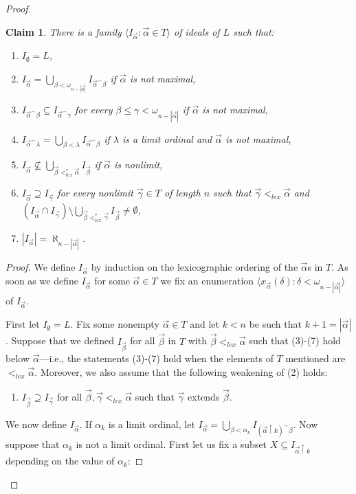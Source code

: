 \documentclass[]{amsart}
\newtheorem{claim}{Claim}[theorem]
\theoremstyle{definition}
\theoremstyle{remark}
\begin{document}
\begin{proof}
\begin{claim}\label{prop:wehrung:claim:1}
There is a family $\langle I_{\vec{\alpha}} : \vec{\alpha} \in T\rangle$ of ideals  of $L$ such that:
\begin{enumerate}[label={\upshape (\arabic*)}]
\item $I_{\emptyset} = L$,
\item $I_{\vec{\alpha}} = \bigcup_{\beta < \omega_{n-|\vec{\alpha}|}} I_{\vec{\alpha}^\smallfrown \beta}$ if $\vec{\alpha}$ is not maximal,
\item $I_{\vec{\alpha}^\smallfrown \beta} \subseteq I_{\vec{\alpha}^\smallfrown \gamma}$ for every $\beta \le \gamma < \omega_{n-|\vec{\alpha}|}$ if $\vec{\alpha}$ is not maximal,
\item $I_{\vec{\alpha}^\smallfrown \lambda} = \bigcup_{\beta < \lambda} I_{\vec{\alpha}^\smallfrown \beta}$ if $\lambda$ is a limit ordinal and $\vec{\alpha}$ is not maximal,
\item $I_{\vec{\alpha}} \nsubseteq \bigcup_{\vec{\beta} <_{lex}^* \vec{\alpha}} I_{\vec{\beta}}$ if $\vec{\alpha}$ is nonlimit,
\item $I_{\vec{\alpha}} \supseteq I_{\vec{\gamma}}$ for every nonlimit $\vec{\gamma} \in T$ of length $n$ such that $\vec{\gamma} <_{lex} \vec{\alpha}$ and $(I_{\vec{\alpha}} \cap I_{\vec{\gamma}}) \setminus \bigcup_{\vec{\beta} <_{lex}^* \vec{\gamma}} I_{\vec{\beta}} \neq \emptyset$,
\item $|I_{\vec{\alpha}}| = \aleph_{n-|\vec{\alpha}|}$.
\end{enumerate}
\end{claim}
\begin{proof}
We define $I_{\vec{\alpha}}$ by induction on the lexicographic ordering of the $\vec{\alpha}$s in $T$. As soon as we define $I_{\vec{\alpha}}$ for some $\vec{\alpha} \in T$ we fix an enumeration $\langle x_{\vec{\alpha}}(\delta) : \delta < \omega_{n-|\vec{\alpha}|} \rangle$ of $I_{\vec{\alpha}}$. 

First let $I_{\emptyset} = L$. Fix some nonempty $\vec{\alpha} \in T$ and let $k < n$ be such that $k+1 = |\vec{\alpha}|$. Suppose that we defined $I_{\vec{\beta}}$ for all $\vec{\beta}$ in $T$ with $\vec{\beta} <_{lex} \vec{\alpha}$ such that (3)-(7) hold below $\vec{\alpha}$---i.e., the statements (3)-(7) hold when the elements of $T$ mentioned are $<_{lex} \vec{\alpha}$. Moreover, we also assume that the following weakening of (2) holds:
\begin{enumerate}
\item[(2')] $I_{\vec{\beta}} \supseteq I_{\vec{\gamma}}$ for all $\vec{\beta},\vec{\gamma} <_{lex} \vec{\alpha}$ such that $\vec{\gamma}$ extends $\vec{\beta}$.
\end{enumerate} 
We now define $I_{\vec{\alpha}}$. If $\alpha_k$ is a limit ordinal, let $I_{\vec{\alpha}} = \bigcup_{\beta < \alpha_k} I_{(\vec{\alpha} \upharpoonright k)^\smallfrown \beta}$. Now suppose that $\alpha_k$ is not a limit ordinal. First let us fix a subset $X \subseteq I_{\vec{\alpha} \upharpoonright k}$ depending on the value of $\alpha_k$:\vspace{0.5em}


\end{proof}
\end{proof}
\end{document}
